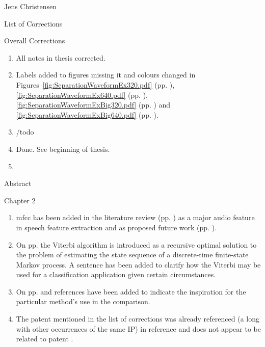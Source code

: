 \clearpage
\thispagestyle{empty}
Jens Christensen

List of Corrections

Overall Corrections

\begin{enumerate}
  \item All notes in thesis corrected.
  \item Labels added to figures missing it and colours changed in Figures~\ref{fig:SeparationWaveformEx320.pdf} (pp. \pageref{fig:SeparationWaveformEx320.pdf}), \ref{fig:SeparationWaveformEx640.pdf} (pp. \pageref{fig:SeparationWaveformEx640.pdf}), \ref{fig:SeparationWaveformExBig320.pdf} (pp. \pageref{fig:SeparationWaveformExBig320.pdf}) and \ref{fig:SeparationWaveformExBig640.pdf} (pp. \pageref{fig:SeparationWaveformExBig640.pdf}).
  \item /todo
  \item Done. See beginning of thesis.
  \item
\end{enumerate}

Abstract

Chapter 2
\begin{enumerate}
\item \gls{mfcc} has been added in the literature review (pp. \pageref{corrections:mfcc1}) as a major audio feature in speech feature extraction and as proposed future work (pp. \pageref{corrections:mfcc2}).
    \item On pp. \pageref{corrections:viterbi} the Viterbi algorithm is introduced as a recursive optimal solution to the problem of estimating the state sequence of a discrete-time finite-state Markov process. A sentence has been added to clarify how the Viterbi may be used for a classification application given certain circumstances.
    \item On pp. \pageref{fig:LitRev_DetectCompare} and \pageref{fig:LitRev_DetectCompare2} references have been added to indicate the inspiration for the particular method's use in the comparison.
    \item The patent mentioned in the list of corrections was already referenced (a long with other occurrences of the same IP) in reference \cite{Seltzer2011Patent} and does not appear to be related to patent \cite{US8233353}.
        
    \end{enumerate}
